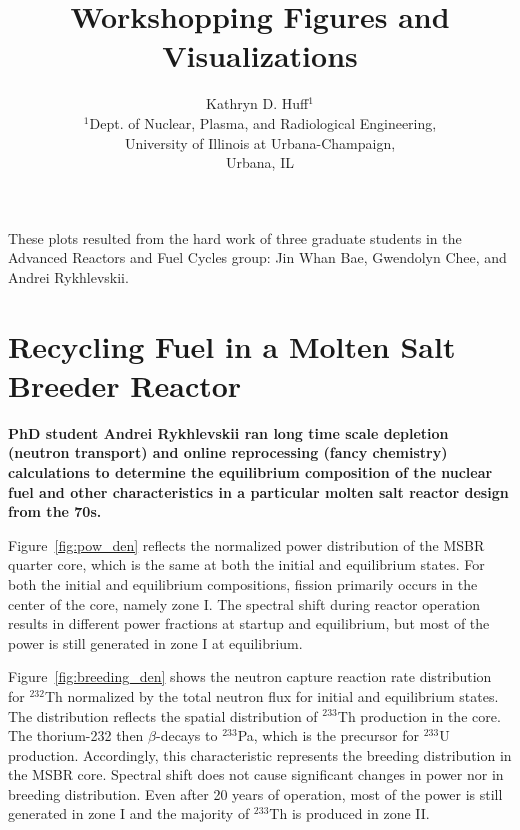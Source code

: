 \documentclass{article}
\begin{document}
\title{Workshopping Figures and Visualizations}
\author{Kathryn D. Huff$^{1}$\\
        $^{1}$Dept. of Nuclear, Plasma, and Radiological Engineering, \\
University of Illinois at Urbana-Champaign, \\
Urbana, IL}

\date{}
\maketitle 
These plots resulted from the hard work of three graduate students in the 
Advanced Reactors and Fuel Cycles group: Jin Whan Bae, Gwendolyn 
Chee, and Andrei Rykhlevskii.

\section*{Recycling Fuel in a Molten Salt Breeder Reactor \cite{rykhlevskii_modeling_2018}}

\textbf{PhD student Andrei Rykhlevskii ran long time scale depletion (neutron 
transport) and online reprocessing (fancy chemistry) calculations to determine 
the equilibrium composition of the nuclear fuel and other characteristics in a 
particular molten salt reactor design from the 70s.} 

Figure~\ref{fig:pow_den} reflects the
normalized power distribution of the \gls{MSBR} quarter core, which is the same
at both the initial and equilibrium states. For both the initial and equilibrium compositions, fission
primarily occurs in the center of the core, namely zone I. The spectral shift
during reactor operation results in different power fractions at startup and
equilibrium, but most of the power is still generated in zone I at equilibrium.

Figure~\ref{fig:breeding_den} shows the neutron capture reaction rate
distribution for $^{232}$Th normalized by the total neutron flux for initial
and equilibrium states. The distribution reflects the spatial distribution of
$^{233}$Th production in the core. The thorium-232 then $\beta$-decays to
$^{233}$Pa, which is the precursor for $^{233}$U production. Accordingly, this
characteristic represents the breeding distribution in the \gls{MSBR} core.
Spectral shift does not cause significant changes in power nor in breeding
distribution. Even after 20 years of operation, most of the power is still
generated in zone I and the majority of $^{233}$Th is
produced in zone II.
\end{document}
